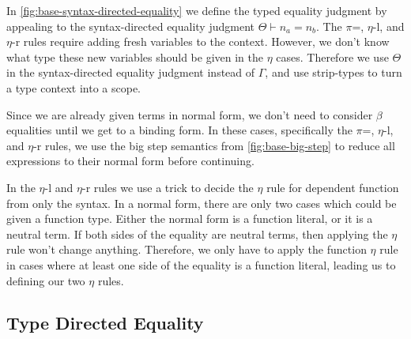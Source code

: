 \documentclass[sigplan]{acmart}
\newcommand{\stxEqJ}[3]{#1 \vdash #2 = #3}
\begin{document}
In \autoref{fig:base-syntax-directed-equality} we define the typed equality judgment by appealing to the syntax-directed equality judgment $\stxEqJ{\Theta}{n_a}{n_b}$.
The $\pi$=, $\eta$-l, and $\eta$-r rules require adding fresh variables to the context.
However, we don't know what type these new variables should be given in the $\eta$ cases.
Therefore we use $\Theta$ in the syntax-directed equality judgment instead of $\Gamma$, and use strip-types to turn a type context into a scope.

Since we are already given terms in normal form, we don't need to consider $\beta$ equalities until we get to a binding form.
In these cases, specifically the $\pi$=, $\eta$-l, and $\eta$-r rules, we use the big step semantics from \autoref{fig:base-big-step} to reduce all expressions to their normal form before continuing.

In the $\eta$-l and $\eta$-r rules we use a trick to decide the $\eta$ rule for dependent function from only the syntax.
In a normal form, there are only two cases which could be given a function type.
Either the normal form is a function literal, or it is a neutral term.
If both sides of the equality are neutral terms, then applying the $\eta$ rule won't change anything.
Therefore, we only have to apply the function $\eta$ rule in cases where at least one side of the equality is a function literal, leading us to defining our two $\eta$ rules.

\subsection{Type Directed Equality}
\end{document}
